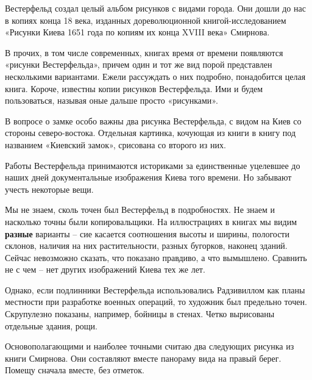 Вестерфельд создал целый альбом рисунков с видами города. Они дошли до нас в копиях конца 18 века, изданных дореволюционной книгой-исследованием «Рисунки Киева 1651 года по копиям их конца XVIII века» Смирнова.

В прочих, в том числе современных, книгах время от времени появляются «рисунки Вестерфельда», причем один и тот же вид порой представлен несколькими вариантами. Ежели рассуждать о них подробно, понадобится целая книга. Короче, известны копии рисунков Вестерфельда. Ими и будем пользоваться, называя оные дальше просто «рисунками».

В вопросе о замке особо важны два рисунка Вестерфельда, с видом на Киев со стороны северо-востока. Отдельная картинка, кочующая из книги в книгу под названием «Киевский замок», срисована со второго из них.

Работы Вестерфельда принимаются историками за единственные уцелевшее до наших дней документальные изображения Киева того времени. Но забывают учесть некоторые вещи.

Мы не знаем, сколь точен был Вестерфельд в подробностях. Не знаем и насколько точны были копировальщики. На иллюстрациях в книгах мы видим \textbf{разные} варианты – сие касается соотношения высоты и ширины, пологости склонов, наличия на них растительности, разных бугорков, наконец зданий. Сейчас невозможно сказать, что показано правдиво, а что вымышлено. Сравнить не с чем – нет других изображений Киева тех же лет.

Однако, если подлинники Вестерфельда использовались Радзивиллом как планы местности при разработке военных операций, то художник был предельно точен. Скрупулезно показаны, например, бойницы в стенах. Четко вырисованы отдельные здания, рощи.



Основополагающими и наиболее точными считаю два следующих рисунка из книги Смирнова. Они составляют вместе панораму вида на правый берег. Помещу сначала вместе, без отметок.

\newpage

